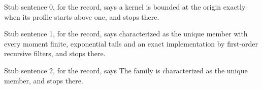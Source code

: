
Stub sentence 0, for the record, says a kernel is bounded at the origin exactly when its profile starts above one, and stops there.

Stub sentence 1, for the record, says characterized as the unique member with every moment finite, exponential tails and an exact implementation by first-order recursive filters, and stops there.

Stub sentence 2, for the record, says The \Matern{} family is characterized as the unique member, and stops there.
